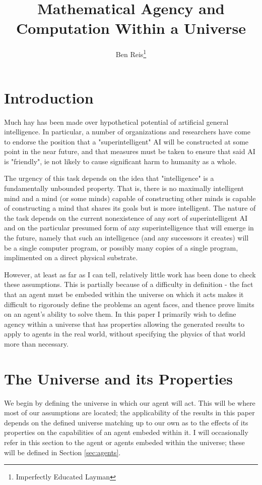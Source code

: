 \documentclass[12pt]{article}
\begin{document}
\title{Mathematical Agency and Computation Within a Universe}
\author{Ben Reis\footnote[\(\ast\)]{Imperfectly Educated Layman}}
\maketitle

\section{Introduction}
Much hay has been made over hypothetical potential of artificial general
intelligence. In particular, a number of organizations and researchers have come
to endorse the position that a "superintelligent" AI will be constructed at some
point in the near future, and that measures must be taken to ensure that said AI
is "friendly", ie not likely to cause significant harm to humanity as a whole.

The urgency of this task depends on the idea that "intelligence" is a
fundamentally unbounded property. That is, there is no maximally intelligent
mind and a mind (or some minds) capable of constructing other minds is capable
of constructing a mind that shares its goals but is more intelligent. The nature
of the task depends on the current nonexistence of any sort of superintelligent
AI and on the particular presumed form of any superintelligence that will emerge
in the future, namely that such an intelligence (and any successors it creates)
will be a single computer program, or possibly many copies of a single program,
implimented on a direct physical substrate.

However, at least as far as I can tell, relatively little work has been done to
check these assumptions. This is partially because of a difficulty in definition
- the fact that an agent must be embeded within the universe on which it acts
makes it difficult to rigorously define the problems an agent faces, and thence
prove limits on an agent's ability to solve them. In this paper I primarily wish
to define agency within a universe that has properties allowing the generated
results to apply to agents in the real world, without specifying the physics of
that world more than necessary.

\section{The Universe and its Properties}
\label{sec:universe}

We begin by defining the universe in which our agent will act. This will be
where most of our assumptions are located; the applicability of the results in
this paper depends on the defined universe matching up to our own as to the
effects of its properties on the capabilities of an agent embeded within it. I
will occasionally refer in this section to the agent or agents embeded within
the universe; these will be defined in Section \ref{sec:agents}.
\end{document}

